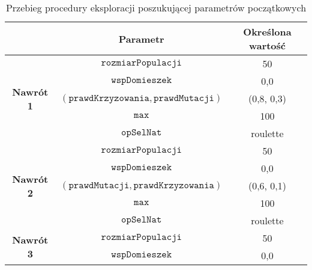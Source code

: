 \documentclass[twoside]{iisthesis}
\newcommand{\param}[1]{\mathtt{#1}}
\begin{document}
\begin{table}[h]
	\caption{Przebieg procedury eksploracji poszukującej parametrów początkowych \label{table:tsp_init_flow}}
	\centering
	\begin{tabular}{c|c|c|}
		\cline{2-3}
		\multicolumn{1}{l|}{}                                 & {\bf Parametr}                                     & {\bf Określona wartość} \\ \hline
		\multicolumn{1}{|c|}{\multirow{5}{*}{{\bf Nawrót 1}}} & $\param{rozmiarPopulacji}$                         & 50                      \\ \cline{2-3} 
		\multicolumn{1}{|c|}{}                                & $\param{wspDomieszek}$                             & 0,0                     \\ \cline{2-3} 
		\multicolumn{1}{|c|}{}                                & $(\param{prawdKrzyzowania}, \param{prawdMutacji})$ & (0,8, 0,3)              \\ \cline{2-3} 
		\multicolumn{1}{|c|}{}                                & $\param{max}$                                      & 100                     \\ \cline{2-3} 
		\multicolumn{1}{|c|}{}                                & $\param{opSelNat}$                                 & roulette                \\ \hline
		\hline
		\multicolumn{1}{|c|}{\multirow{5}{*}{{\bf Nawrót 2}}} & $\param{rozmiarPopulacji}$                         & 50                      \\ \cline{2-3} 
		\multicolumn{1}{|c|}{}                                & $\param{wspDomieszek}$                             & 0,0                     \\ \cline{2-3} 
		\multicolumn{1}{|c|}{}                                & $(\param{prawdMutacji}, \param{prawdKrzyzowania})$ & (0,6, 0,1)              \\ \cline{2-3} 
		\multicolumn{1}{|c|}{}                                & $\param{max}$                                      & 100                     \\ \cline{2-3} 
		\multicolumn{1}{|c|}{}                                & $\param{opSelNat}$                                 & roulette                \\ \hline
		\hline
		\multicolumn{1}{|c|}{\multirow{5}{*}{{\bf Nawrót 3}}} & $\param{rozmiarPopulacji}$                         & 50                      \\ \cline{2-3} 
		\multicolumn{1}{|c|}{}                                & $\param{wspDomieszek}$                             & 0,0                     \\ \cline{2-3} 

\end{tabular}
\end{table}
\end{document}

